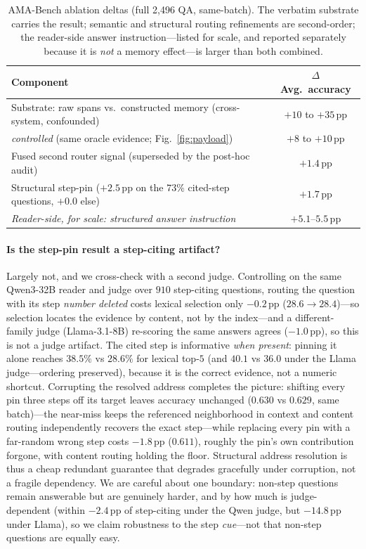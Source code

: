 \documentclass{article} %
\newcommand{\pp}{\,\mathrm{pp}}
\begin{document}
\begin{table}[h]
\centering
\caption{AMA-Bench ablation deltas (full 2{,}496 QA, same-batch). The verbatim
substrate carries the result; semantic and structural routing refinements are
second-order; the reader-side answer instruction---listed for scale, and reported
separately because it is \emph{not} a memory effect---is larger than both
combined.}
\label{tab:ablation}
\small
\begin{tabular}{lc}
\toprule
Component & $\Delta$ Avg.\ accuracy \\
\midrule
Substrate: raw spans vs.\ constructed memory (cross-system, confounded) & $+10$ to $+35\pp$ \\
\quad\emph{controlled} (same oracle evidence; Fig.~\ref{fig:payload}) & $+8$ to $+10\pp$ \\
Fused second router signal (superseded by the post-hoc audit) & $+1.4\pp$ \\
Structural step-pin ($+2.5\pp$ on the $73\%$ cited-step questions, $+0.0$ else) & $+1.7\pp$ \\
\midrule
\emph{Reader-side, for scale: structured answer instruction} & $+5.1$--$5.5\pp$ \\
\bottomrule
\end{tabular}
\end{table}

\paragraph{Is the step-pin result a step-citing artifact?}
Largely not, and we cross-check with a second judge. Controlling on the same
Qwen3-32B reader and judge over $910$ step-citing questions, routing the question
with its step \emph{number deleted} costs lexical selection only $-0.2\pp$
($28.6\to28.4$)---so selection locates the evidence by content, not by the
index---and a different-family judge (Llama-3.1-8B) re-scoring the same answers
agrees ($-1.0\pp$), so this is not a judge artifact. The cited step is informative
\emph{when present}: pinning it alone reaches $38.5\%$ vs $28.6\%$ for lexical
top-$5$ (and $40.1$ vs $36.0$ under the Llama judge---ordering preserved), because
it is the correct evidence, not a numeric shortcut. Corrupting the resolved address
completes the picture: shifting every pin three steps off its target leaves accuracy
unchanged ($0.630$ vs $0.629$, same batch)---the near-miss keeps the referenced
neighborhood in context and content routing independently recovers the exact
step---while replacing every pin with a far-random wrong step costs $-1.8\pp$
($0.611$), roughly the pin's own contribution forgone, with content routing holding
the floor. Structural address resolution is thus a cheap redundant guarantee that
degrades gracefully under corruption, not a fragile dependency. We are careful about
one boundary: non-step questions remain answerable but are genuinely harder, and by
how much is judge-dependent (within $-2.4\pp$ of step-citing under the Qwen judge,
but $-14.8\pp$ under Llama), so we claim robustness to the step \emph{cue}---not
that non-step questions are equally easy.
\end{document}
